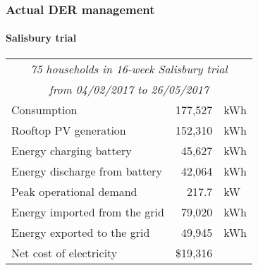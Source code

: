 \documentclass[handout, smaller, xcolor=table]{beamer}			%
\begin{document}
\begin{frame}
	\frametitle{Actual DER management}
	\framesubtitle{Salisbury trial}

	\begin{table}
	\centering
	\begin{tabular}{l r @{ } l}
		\toprule
		\multicolumn{3}{c}{\textit{75 households in 16-week Salisbury trial}}	\\
		\multicolumn{3}{c}{\textit{from 04/02/2017 to 26/05/2017}}	\\
		\midrule
		Consumption				& 177,527&kWh	\\
		Rooftop PV generation 		& 152,310&kWh	\\
		Energy charging battery		& 45,627&kWh		\\
		Energy discharge from battery	& 42,064&kWh		\\
		Peak operational demand		& 217.7&kW		\\
		Energy imported from the grid	& 79,020&kWh		\\
		Energy exported to the grid	& 49,945&kWh		\\
		Net cost of electricity			& \$19,316&		\\
		\bottomrule
	\end{tabular}
	\end{table}

\end{frame}

\end{document}
